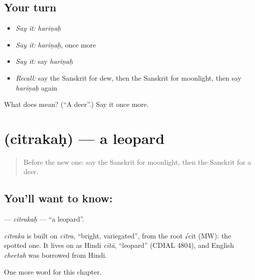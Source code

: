 \subsection*{Your turn}
\begin{itemize}
\raggedright
  \item \emph{Say it:} \emph{hariṇaḥ}
  \item \emph{Say it:} \emph{hariṇaḥ}, once more
  \item \emph{Say it:} say \emph{hariṇaḥ}
  \item \emph{Recall:} say the Sanskrit for dew, then the Sanskrit for moonlight, then say \emph{hariṇaḥ} again
\end{itemize}

\begin{tcolorbox}[breakable,colback=teal!4,colframe=teal!35!black,title={Before you move on}]
What does  mean? (\textquotedblleft{}A deer\textquotedblright{}.) Say it once more.
\end{tcolorbox}
\section[\texorpdfstring{\sk{चित्रकः} (citrakaḥ)}{चित्रकः (citrakaḥ)}]{ (citrakaḥ) — a leopard}

\label{lesson:SA-C198-citrakah}



\begin{quote}
Before the new one: say the Sanskrit for moonlight, then the Sanskrit for a deer.
\end{quote}

\subsection*{You'll want to know: }
\textbf{} — \emph{citrakaḥ} — \textquotedblleft{}a leopard\textquotedblright{}.

\begin{cousinweb}
\emph{citraka} is built on \emph{citra}, \textquotedblleft{}bright, variegated\textquotedblright{}, from the root √cit (MW): the spotted one. It lives on as Hindi \emph{cītā}, \textquotedblleft{}leopard\textquotedblright{} (CDIAL 4804), and English \emph{cheetah} was borrowed from Hindi.
\end{cousinweb}

\begin{grammarlens}[title={What you've built}]
One more word for this chapter.
\end{grammarlens}

